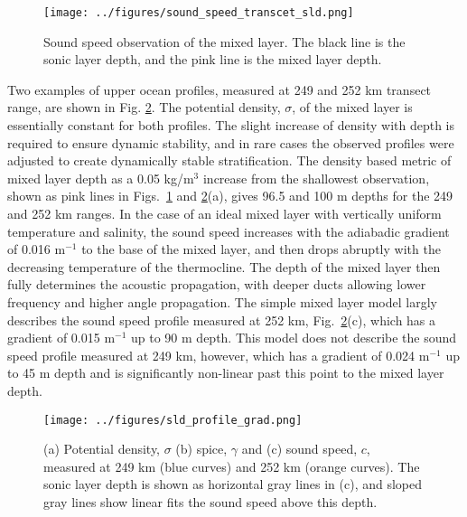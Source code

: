 \documentclass[preprint,NumberedRefs]{JASA}
\begin{document}
\begin{figure}
\texttt{[image: ../figures/sound\_speed\_transcet\_sld.png]}
\caption{\label{fig:c_grid}{Sound speed observation of the mixed layer. The black line is the sonic layer depth, and the pink line is the mixed layer depth.}}
\end{figure}

Two examples of upper ocean profiles, measured at 249 and 252 km transect range, are shown in Fig. \ref{fig:profiles}. The potential density, $\sigma$, of the mixed layer is essentially constant for both profiles. The slight increase of density with depth is required to ensure dynamic stability, and in rare cases the observed profiles were adjusted to create dynamically stable stratification\citep{barker2017stabilizing}. The density based metric of mixed layer depth as a 0.05 kg/m$^3$ increase from the shallowest observation\cite{cole2010seasonal}, shown as pink lines in Figs.~\ref{fig:c_grid} and \ref{fig:profiles}(a), gives 96.5 and 100 m depths for the 249 and 252 km ranges. In the case of an ideal mixed layer with vertically uniform temperature and salinity, the sound speed increases with the adiabadic gradient of 0.016 m$^{-1}$ to the base of the mixed layer, and then drops abruptly with the decreasing temperature of the thermocline. The depth of the mixed layer then fully determines the acoustic propagation, with deeper ducts allowing lower frequency and higher angle propagation. The simple mixed layer model largly describes the sound speed profile measured at 252 km, Fig.~\ref{fig:profiles}(c), which has a gradient of 0.015 m$^{-1}$ up to 90 m depth. This model does not describe the sound speed profile measured at 249 km, however, which has a gradient of 0.024 m$^{-1}$ up to 45 m depth and is significantly non-linear past this point to the mixed layer depth.
\begin{figure}
\texttt{[image: ../figures/sld\_profile\_grad.png]}
    \caption{\label{fig:profiles}{(a) Potential density, $\sigma$ (b) spice, $\gamma$ and (c) sound speed, $c$, measured at 249 km (blue curves) and 252 km (orange curves). The sonic layer depth is shown as horizontal gray lines in (c), and sloped gray lines show linear fits the sound speed above this depth.}}
\end{figure}
\end{document}
